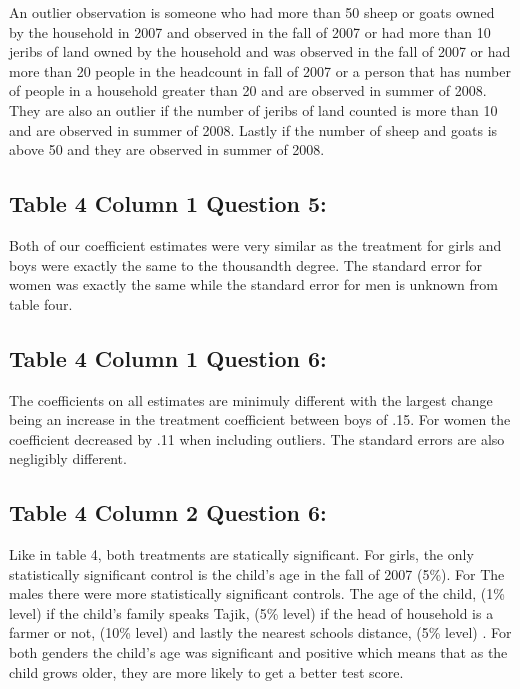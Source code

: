 \documentclass[
]{article}
\begin{document}
An outlier observation is someone who had more than 50 sheep or goats
owned by the household in 2007 and observed in the fall of 2007 or had
more than 10 jeribs of land owned by the household and was observed in
the fall of 2007 or had more than 20 people in the headcount in fall of
2007 or a person that has number of people in a household greater than
20 and are observed in summer of 2008. They are also an outlier if the
number of jeribs of land counted is more than 10 and are observed in
summer of 2008. Lastly if the number of sheep and goats is above 50 and
they are observed in summer of 2008.

\hypertarget{table-4-column-1-question-5}{%
\subsection{Table 4 Column 1 Question
5:}\label{table-4-column-1-question-5}}

Both of our coefficient estimates were very similar as the treatment for
girls and boys were exactly the same to the thousandth degree. The
standard error for women was exactly the same while the standard error
for men is unknown from table four.

\hypertarget{table-4-column-1-question-6}{%
\subsection{Table 4 Column 1 Question
6:}\label{table-4-column-1-question-6}}

The coefficients on all estimates are minimuly different with the
largest change being an increase in the treatment coefficient between
boys of .15. For women the coefficient decreased by .11 when including
outliers. The standard errors are also negligibly different.

\hypertarget{table-4-column-2-question-6}{%
\subsection{Table 4 Column 2 Question
6:}\label{table-4-column-2-question-6}}

Like in table 4, both treatments are statically significant. For girls,
the only statistically significant control is the child's age in the
fall of 2007 (5\%). For The males there were more statistically
significant controls. The age of the child, (1\% level) if the child's
family speaks Tajik, (5\% level) if the head of household is a farmer or
not, (10\% level) and lastly the nearest schools distance, (5\% level) .
For both genders the child's age was significant and positive which
means that as the child grows older, they are more likely to get a
better test score.
\end{document}
